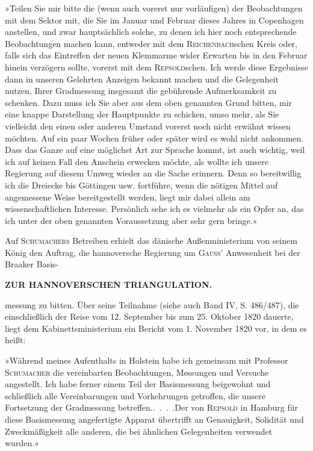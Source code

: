 \par\noindent\hspace*{\parindent}»Teilen Sie mir bitte die (wenn auch vorerst nur vorläufigen)  der Beobachtungen mit dem Sektor mit, die Sie im Januar und Februar dieses Jahres in Copenhagen anstellen, und zwar hauptsächlich solche, zu denen ich hier noch entsprechende Beobachtungen machen kann, entweder mit dem \textsc{Reichenbach}schen Kreis oder, falls sich das Eintreffen der neuen Klemmarme wider Erwarten bis in den Februar hinein verzögern sollte, vorerst mit dem \textsc{Repsold}schen. Ich werde diese Ergebnisse dann in unseren Gelehrten Anzeigen bekannt machen und die Gelegenheit nutzen, Ihrer Gradmessung insgesamt die gebührende Aufmerksamkeit zu schenken. Dazu muss ich Sie aber aus dem oben genannten Grund bitten, mir eine knappe Darstellung der Hauptpunkte zu schicken, umso mehr, als Sie vielleicht den einen oder anderen Umstand vorerst noch nicht erwähnt wissen möchten. Auf ein paar Wochen früher oder später wird es wohl nicht ankommen. Dass das Ganze auf eine möglichst  Art zur Sprache kommt, ist auch  wichtig, weil ich auf keinen Fall den Anschein erwecken möchte, als wollte ich unsere Regierung auf diesem Umweg wieder an die Sache erinnern. Denn so bereitwillig ich die Dreiecke bis Göttingen usw. fortführe, wenn die nötigen Mittel auf angemessene Weise bereitgestellt werden, liegt mir dabei allein am wissenschaftlichen Interesse. Persönlich sehe ich es vielmehr als ein Opfer an, das ich unter der oben genannten Voraussetzung aber sehr gern bringe.«

\par\noindent\hspace*{\parindent}Auf \textsc{Schumachers} Betreiben erhielt das dänische Außenministerium von seinem König den Auftrag, die hannoversche Regierung um \textsc{Gauss}' Anwesenheit bei der Braaker Basis-\par

\clearpage
\noindent\null\hfill\textbf{ZUR HANNOVERSCHEN TRIANGULATION.}\hfill{}\par\medskip
\noindent messung zu bitten. Über seine Teilnahme (siehe auch Band IV, S. 486/487), die einschließlich der Reise vom 12. September bis zum 25. Oktober 1820 dauerte, liegt dem Kabinettsministerium ein Bericht vom 1. November 1820 vor, in dem es heißt:

\par\noindent\hspace*{\parindent}»Während meines Aufenthalts in Holstein habe ich gemeinsam mit Professor \textsc{Schumacher} die vereinbarten Beobachtungen, Messungen und Versuche angestellt. Ich habe ferner einem Teil der Basismessung beigewohnt und schließlich alle Vereinbarungen und Vorkehrungen getroffen, die unsere Fortsetzung der Gradmessung betreffen.\enspace .\ .\ .\ .\enspace Der von \textsc{Repsold} in Hamburg für diese Basismessung angefertigte Apparat übertrifft an Genauigkeit, Solidität und Zweckmäßigkeit alle anderen, die bei ähnlichen Gelegenheiten verwendet wurden.«

